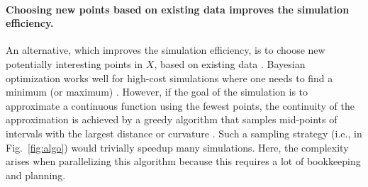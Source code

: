 \documentclass[english, twocolumn, 10pt, aps, superscriptaddress, floatfix, prb, citeautoscript]{revtex4-1}
\renewcommand{\citep}{\cite}
\begin{document}
\paragraph{Choosing new points based on existing data improves the simulation efficiency.}

An alternative, which improves the simulation efficiency, is to choose new potentially interesting points in \(X\), based on existing data \citep{Gramacy2004, Figueiredo1995, Castro2008, Chen2017}.
Bayesian optimization works well for high-cost simulations where one needs to find a minimum (or maximum) \citep{Takhtaganov2018}.
However, if the goal of the simulation is to approximate a continuous function using the fewest points, the continuity of the approximation is achieved by a greedy algorithm that samples mid-points of intervals with the largest distance or curvature \citep{Wolfram2011}.
Such a sampling strategy (i.e., in Fig.~\ref{fig:algo}) would trivially speedup many simulations.
Here, the complexity arises when parallelizing this algorithm because this requires a lot of bookkeeping and planning.
\end{document}
